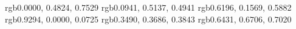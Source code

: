 \documentclass[tikz,border=0pt,12pt]{standalone} %
\begin{document}
	\definecolor{blue50} {rgb}{0.0000, 0.4824, 0.7529}
	\definecolor{turq50} {rgb}{0.0941, 0.5137, 0.4941}
	\definecolor{purp40} {rgb}{0.6196, 0.1569, 0.5882}
	\definecolor{red50}  {rgb}{0.9294, 0.0000, 0.0725}
	\definecolor{gray40} {rgb}{0.3490, 0.3686, 0.3843}%
	\definecolor{gray70} {rgb}{0.6431, 0.6706, 0.7020}%
	
	\newlength{\mywidthA}
	\setlength{\mywidthA}{11.34cm} 		%
	\newlength{\myheightA}
	\setlength{\myheightA}{5.67cm} 		%
	
	\newlength{\mywidthB}
	\setlength{\mywidthB}{12.96cm} 		%
	\newlength{\myheightB}
	\setlength{\myheightB}{8.6832cm} 	%
	
	
\end{document}

